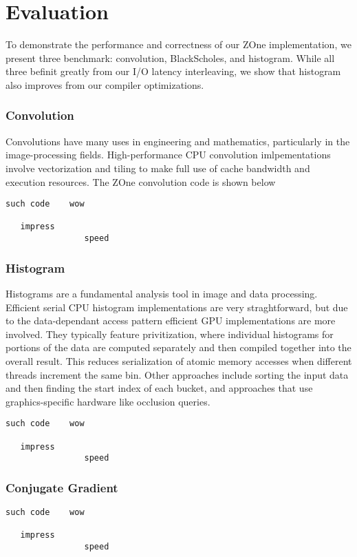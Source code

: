 \section{Evaluation}

To demonstrate the performance and correctness of our ZOne implementation, we
present three benchmark: convolution, BlackScholes, and histogram.
While all three befinit greatly from our I/O latency interleaving, we show
	that histogram also improves from our compiler optimizations.

\subsubsection{Convolution}
Convolutions have many uses in engineering and mathematics, particularly in
the image-processing fields. High-performance CPU convolution imlpementations
involve vectorization and tiling to make full use of cache bandwidth and 
execution resources. The ZOne convolution code is shown below

\begin{verbatim}
such code    wow

   impress
                speed
\end{verbatim}


\subsubsection{Histogram}
Histograms are a fundamental analysis tool in image and data processing.
Efficient serial CPU histogram implementations are very straghtforward, but
due to the data-dependant access pattern efficient GPU implementations are
more involved. They typically feature privitization,
where individual histograms for portions of the data are computed separately
and then compiled together into the overall result. This reduces serialization
of atomic memory accesses when different threads increment the same bin.
Other approaches include sorting the input data and then finding the start
index of each bucket, and approaches that use graphics-specific hardware like
occlusion queries.

\begin{verbatim}
such code    wow

   impress
                speed
\end{verbatim}


\subsubsection{Conjugate Gradient}

\begin{verbatim}
such code    wow

   impress
                speed
\end{verbatim}

